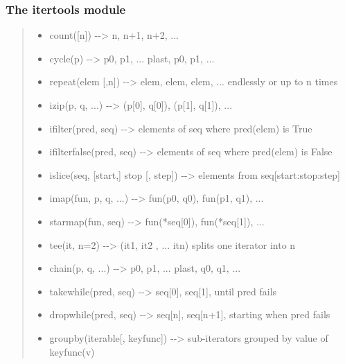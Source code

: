 \documentclass[10pt,a4paper,english]{article}
\begin{document}
\subsubsection*{The itertools module}
\begin{quote}
\begin{itemize}
\item {} 
count({[}n]) -{}-{\textgreater} n, n+1, n+2, ...

\item {} 
cycle(p) -{}-{\textgreater} p0, p1, ... plast, p0, p1, ...

\item {} 
repeat(elem {[},n]) -{}-{\textgreater} elem, elem, elem, ... endlessly or up to n times

\item {} 
izip(p, q, ...) -{}-{\textgreater} (p{[}0], q{[}0]), (p{[}1], q{[}1]), ...

\item {} 
ifilter(pred, seq) -{}-{\textgreater} elements of seq where pred(elem) is True

\item {} 
ifilterfalse(pred, seq) -{}-{\textgreater} elements of seq where pred(elem) is False

\item {} 
islice(seq, {[}start,] stop {[}, step]) -{}-{\textgreater} elements from seq{[}start:stop:step]

\item {} 
imap(fun, p, q, ...) -{}-{\textgreater} fun(p0, q0), fun(p1, q1), ...

\item {} 
starmap(fun, seq) -{}-{\textgreater} fun(*seq{[}0]), fun(*seq{[}1]), ...

\item {} 
tee(it, n=2) -{}-{\textgreater} (it1, it2 , ... itn) splits one iterator into n

\item {} 
chain(p, q, ...) -{}-{\textgreater} p0, p1, ... plast, q0, q1, ...

\item {} 
takewhile(pred, seq) -{}-{\textgreater} seq{[}0], seq{[}1], until pred fails

\item {} 
dropwhile(pred, seq) -{}-{\textgreater} seq{[}n], seq{[}n+1], starting when pred fails

\item {} 
groupby(iterable{[}, keyfunc]) -{}-{\textgreater} sub-iterators grouped by value of keyfunc(v)

\end{itemize}
\end{quote}
\end{document}
